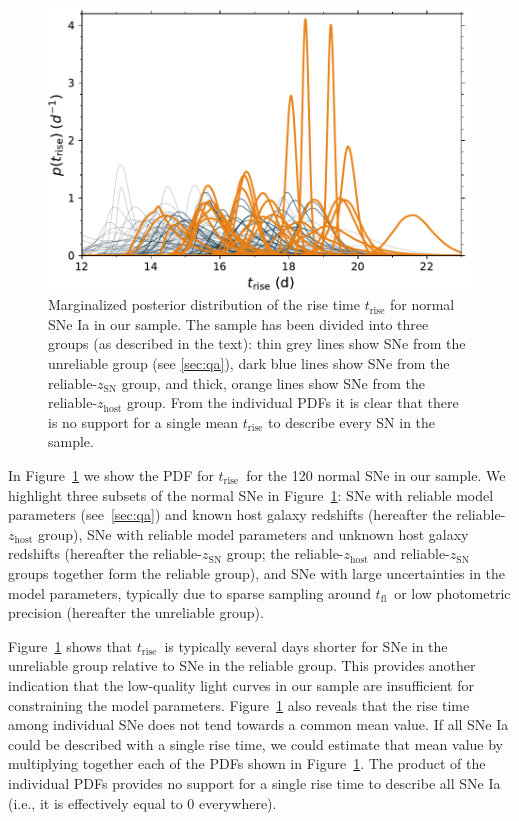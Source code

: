 \documentclass[twocolumn]{aastex63}
\newcommand{\tfl}{$t_\mathrm{fl}$}
\newcommand{\trise}{$t_\mathrm{rise}$}
\begin{document}
\begin{figure}
    \centering
    \includegraphics[width=1\linewidth]{./figures/rise_time.pdf}
    \caption{Marginalized posterior distribution of the rise time
    $t_\mathrm{rise}$ for normal SNe Ia in our sample. The sample has been
    divided into three groups (as described in the text): thin grey lines show
    SNe from the unreliable group (see \ref{sec:qa}), dark blue lines show SNe
    from the reliable-$z_\mathrm{SN}$ group, and thick, orange lines show SNe
    from the reliable-$z_\mathrm{host}$ group. From the individual PDFs it is
    clear that there is no support for a single mean $t_\mathrm{rise}$ to
    describe every SN in the sample.}
    \label{fig:rise_time}
\end{figure}

In Figure~\ref{fig:rise_time} we show the PDF for \trise\ for the 120 normal
SNe in our sample. We highlight three subsets of the normal SNe in
Figure~\ref{fig:rise_time}: SNe with reliable model parameters
(see~\ref{sec:qa}) and known host galaxy redshifts (hereafter the
reliable-$z_\mathrm{host}$ group), SNe with reliable model parameters and
unknown host galaxy redshifts (hereafter the reliable-$z_\mathrm{SN}$ group;
the reliable-$z_\mathrm{host}$ and reliable-$z_\mathrm{SN}$ groups together
form the reliable group), and SNe with large uncertainties in the model
parameters, typically due to sparse sampling around \tfl\ or low photometric
precision (hereafter the unreliable group).

Figure~\ref{fig:rise_time} shows that \trise\ is typically several days
shorter for SNe in the unreliable group relative to SNe in the reliable group.
This provides another indication that the low-quality light curves in our
sample are insufficient for constraining the model parameters.
Figure~\ref{fig:rise_time} also reveals that the rise time among individual
SNe does not tend towards a common mean value. If all SNe Ia could be
described with a single rise time, we could estimate that mean value by
multiplying together each of the PDFs shown in Figure~\ref{fig:rise_time}. The
product of the individual PDFs provides no support for a single rise time to
describe all SNe Ia (i.e., it is effectively equal to 0 everywhere).
\end{document}
